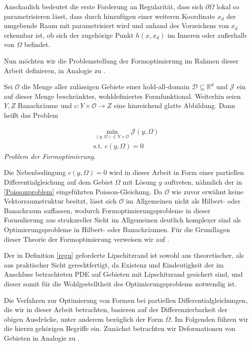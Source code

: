 Anschaulich bedeutet die erste Forderung an Regularität, dass sich $\partial\Omega$ lokal so parametrisieren lässt, dass durch hinzufügen einer weiteren Koordinate $x_d$ der umgebende Raum mit parametrisiert wird und anhand des Vorzeichens von $x_d$ erkennbar ist, ob sich der zugehörige Punkt $h(x,x_d)$ im Inneren oder außerhalb von $\Omega$ befindet.

Nun möchten wir die Problemstellung der Formoptimierung im Rahmen dieser Arbeit definieren, in Analogie zu \cite{LagrangeNewton}.

\begin{defi}
Sei $\mathcal{O}$ die Menge aller zulässigen Gebiete einer hold-all-domain $\mathcal{D}\subseteq\mathbb{R}^d$ und $\mathcal{J}$ ein auf dieser Menge beschränktes, wohldefiniertes Formfunktional. Weiterhin seien $Y,Z$ Banachräume und $c: Y\times \mathcal{O} \rightarrow Z$ eine hinreichend glatte Abbildung. Dann heißt das Problem

\begin{align*}
	\underset{(y,\Omega) \in Y \times \mathcal{O}}{\min} \mathcal{J}(y,\Omega) \\
	\text{s.t. } c(y, \Omega) = 0
\end{align*}
\textit{Problem der Formoptimierung}.
\end{defi}

Die Nebenbedingung $c(y, \Omega) = 0$ wird in dieser Arbeit in Form einer partiellen Differentialgleichung auf dem Gebiet $\Omega$ mit Lösung $y$ auftreten, nähmlich der in \ref{Poissonproblem} eingeführten Poisson-Gleichung. Da $\mathcal{O}$ wie zuvor erwähnt keine Vektorraumstruktur besitzt, lässt sich $\mathcal{O}$ im Allgemeinen nicht als Hilbert- oder Banachraum auffassen, wodurch Formoptimierungsprobleme in dieser Formulierung aus strukureller Sicht im Allgemeinen deutlich komplexer sind als Optimierungsprobleme in Hilbert- oder Banachräumen. Für die Grundlagen dieser Theorie der Formoptimierung verweisen wir auf \cite{shape_space}.

Der in Definition \ref{regu} geforderte Lipschitzrand ist sowohl aus theoretischer, als aus praktischer Sicht gerechtfertigt, da Existenz und Eindeutigkeit der im Anschluss betrachteten PDE auf Gebieten mit Lipschitzrand gesichert sind, und dieser somit für die Wohlgestelltheit des Optimierungsproblems notwendig ist. 

Die Verfahren zur Optimierung von Formen bei partiellen Differentialgleichungen, die wir in dieser Arbeit betrachten, basieren auf der Differenzierbarkeit der obigen Ausdrücke, unter anderem bezüglich der Form $\Omega$. Im Folgenden führen wir die hierzu gehörigen Begriffe ein. Zunächst betrachten wir Deformationen von Gebieten in Analogie zu \cite{bfgs2}.

